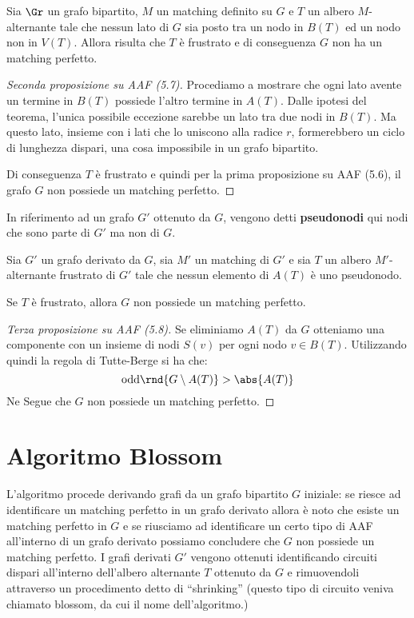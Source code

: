 \documentclass[\main/main.tex]{subfiles}
\begin{document}
\begin{proposition}
	Sia \(\Gr \) un grafo bipartito, \(M\) un matching definito su \(G\) e \(T\) un albero \(M\)-alternante tale che nessun lato di \(G\) sia posto tra un nodo in \(B(T)\) ed un nodo non in \(V(T)\). Allora risulta che \(T\) è frustrato e di conseguenza \(G\) non ha un matching perfetto.
\end{proposition}
\begin{proof}[Seconda proposizione su AAF (5.7)]
	Procediamo a mostrare che ogni lato avente un termine in \(B(T)\) possiede l'altro termine in \(A(T)\). Dalle ipotesi del teorema, l'unica possibile eccezione sarebbe un lato tra due nodi in \(B(T)\). Ma questo lato, insieme con i lati che lo uniscono alla radice \(r\), formerebbero un ciclo di lunghezza dispari, una cosa impossibile in un grafo bipartito.

	Di conseguenza \(T\) è frustrato e quindi per la prima proposizione su AAF (5.6), il grafo \(G\) non possiede un matching perfetto.
\end{proof}
\begin{definition}[Pseudonodo]
	In riferimento ad un grafo \(G'\) ottenuto da \(G\), vengono detti \textbf{pseudonodi} qui nodi che sono parte di \(G'\) ma non di \(G\).
\end{definition}
\begin{proposition}
	Sia \(G'\) un grafo derivato da \(G\), sia \(M'\) un matching di \(G'\) e sia \(T\) un albero \(M'\)-alternante frustrato di \(G'\) tale che nessun elemento di \(A(T)\) è uno pseudonodo.

	Se \(T\) è frustrato, allora \(G\) non possiede un matching perfetto.
\end{proposition}
\begin{proof}[Terza proposizione su AAF (5.8)]
	Se eliminiamo \(A(T)\) da \(G\) otteniamo una componente con un insieme di nodi \(S(v)\) per ogni nodo \(v \in B(T)\). Utilizzando quindi la regola di Tutte-Berge si ha che:
	\[
		\text{odd}\rnd{G \setminus A(T)} > \abs{A(T)}
	\]
	Ne Segue che \(G\) non possiede un matching perfetto.
\end{proof}
\clearpage
\section{Algoritmo Blossom}
L'algoritmo procede derivando grafi da un grafo bipartito \(G\) iniziale: se riesce ad identificare un matching perfetto in un grafo derivato allora è noto che esiste un matching perfetto in \(G\) e se riusciamo ad identificare un certo tipo di AAF all'interno di un grafo derivato possiamo concludere che \(G\) non possiede un matching perfetto. I grafi derivati \(G'\) vengono ottenuti identificando circuiti dispari all'interno dell'albero alternante \(T\) ottenuto da \(G\) e rimuovendoli attraverso un procedimento detto di ``shrinking'' (questo tipo di circuito veniva chiamato blossom, da cui il nome dell'algoritmo.)
\end{document}
